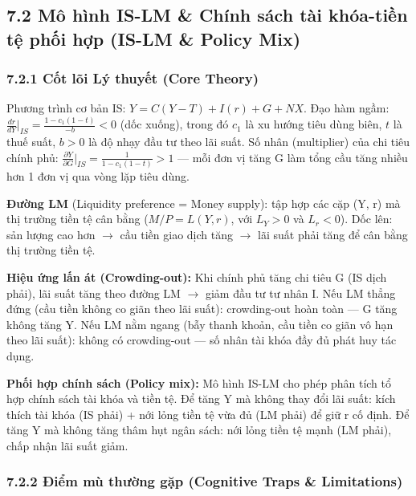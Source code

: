 \documentclass[
]{article}
\begin{document}
\subsection{7.2 Mô hình IS-LM \& Chính sách tài khóa-tiền tệ phối hợp
(IS-LM \& Policy
Mix)}\label{muxf4-huxecnh-is-lm-chuxednh-suxe1ch-tuxe0i-khuxf3a-tiux1ec1n-tux1ec7-phux1ed1i-hux1ee3p-is-lm-policy-mix}

\subsubsection{7.2.1 Cốt lõi Lý thuyết (Core
Theory)}\label{cux1ed1t-luxf5i-luxfd-thuyux1ebft-core-theory-17}

Phương trình cơ bản IS: \(Y = C(Y-T) + I(r) + G + NX\). Đạo hàm ngầm:
\(\frac{dr}{dY}\bigg|_{IS} = \frac{1-c_1(1-t)}{-b} < 0\) (dốc xuống),
trong đó \(c_1\) là xu hướng tiêu dùng biên, \(t\) là thuế suất,
\(b > 0\) là độ nhạy đầu tư theo lãi suất. Số nhân (multiplier) của chi
tiêu chính phủ:
\(\frac{\partial Y}{\partial G}\bigg|_{IS} = \frac{1}{1-c_1(1-t)} > 1\)
--- mỗi đơn vị tăng G làm tổng cầu tăng nhiều hơn 1 đơn vị qua vòng lặp
tiêu dùng.

\textbf{Đường LM} (Liquidity preference = Money supply): tập hợp các cặp
(Y, r) mà thị trường tiền tệ cân bằng (\(M/P = L(Y, r)\), với
\(L_Y > 0\) và \(L_r < 0\)). Dốc lên: sản lượng cao hơn \(\rightarrow\)
cầu tiền giao dịch tăng \(\rightarrow\) lãi suất phải tăng để cân bằng
thị trường tiền tệ.

\textbf{Hiệu ứng lấn át (Crowding-out):} Khi chính phủ tăng chi tiêu G
(IS dịch phải), lãi suất tăng theo đường LM \(\rightarrow\) giảm đầu tư
tư nhân I. Nếu LM thẳng đứng (cầu tiền không co giãn theo lãi suất):
crowding-out hoàn toàn --- G tăng không tăng Y. Nếu LM nằm ngang (bẫy
thanh khoản, cầu tiền co giãn vô hạn theo lãi suất): không có
crowding-out --- số nhân tài khóa đầy đủ phát huy tác dụng.

\textbf{Phối hợp chính sách (Policy mix):} Mô hình IS-LM cho phép phân
tích tổ hợp chính sách tài khóa và tiền tệ. Để tăng Y mà không thay đổi
lãi suất: kích thích tài khóa (IS phải) + nới lỏng tiền tệ vừa đủ (LM
phải) để giữ r cố định. Để tăng Y mà không tăng thâm hụt ngân sách: nới
lỏng tiền tệ mạnh (LM phải), chấp nhận lãi suất giảm.

\subsubsection{7.2.2 Điểm mù thường gặp (Cognitive Traps \&
Limitations)}\label{ux111iux1ec3m-muxf9-thux1b0ux1eddng-gux1eb7p-cognitive-traps-limitations-33}
\end{document}
